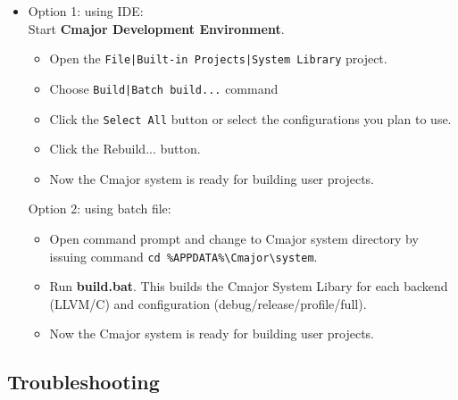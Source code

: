 \documentclass[oneside, a4paper, 11pt]{article}
\begin{document}
\begin{itemize}

\item
Option 1: using IDE:\\

Start \textbf{Cmajor Development Environment}.

\begin{itemize}

\item
Open the \verb!File|Built-in Projects|System Library! project.

\item
Choose \verb!Build|Batch build...! command

\item
Click the \verb|Select All| button or
select the configurations you plan to use.

\item
Click the Rebuild... button.

\item
Now the Cmajor system is ready for building user projects.

\end{itemize}

Option 2: using batch file:

\begin{itemize}

\item
Open command prompt and change to Cmajor system directory by issuing command
\verb|cd %APPDATA%\Cmajor\system|.

\item
Run \textbf{build.bat}.
This builds the Cmajor System Libary for each backend (LLVM/C) and
configuration (debug/release/profile/full).

\item
Now the Cmajor system is ready for building user projects.

\end{itemize}

\end{itemize}

\subsection{Troubleshooting}
\end{document}
